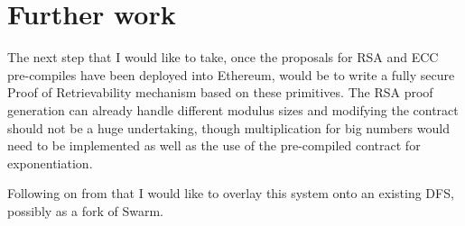 \documentclass[12pt,a4paper,twoside,openright]{report}
\begin{document}
\section{Further work}

The next step that I would like to take, once the proposals for RSA and ECC pre-compiles have been deployed into Ethereum,
would be to write a fully secure Proof of Retrievability mechanism based on these primitives.
The RSA proof generation can already handle different modulus sizes and modifying the contract
should not be a huge undertaking, though multiplication for big numbers would need to be implemented as well
as the use of the pre-compiled contract for exponentiation.


Following on from that I would like to overlay this system onto an existing DFS, possibly as a fork of Swarm.







\begingroup
\raggedright
\printbibliography
\endgroup
\end{document}
